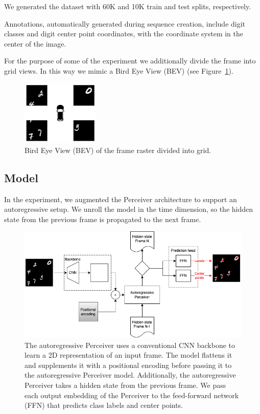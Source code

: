 We generated the dataset with 60K and 10K train and test splits, respectively.

Annotations, automatically generated during sequence creation, include digit classes and digit center point coordinates, with the coordinate system in the center of the image.

For the purpose of some of the experiment we additionally divide the frame into grid views. In this way we mimic a Bird Eye View (BEV) (see Figure~\ref{fig:figure_methods_dataset_image_view_bev}).

\begin{figure}
    \centering
    \includegraphics[width=0.33\textwidth]{figures/figure_methods_dataset_image_view_bev.png}
    \caption{Bird Eye View (BEV) of the frame raster divided into grid.}
    \label{fig:figure_methods_dataset_image_view_bev}
\end{figure}


\subsection{Model}

In the experiment, we augmented the Perceiver architecture \cite{jaeglePerceiverGeneralPerception2021} to support an autoregressive setup. We unroll the model in the time dimension, so the hidden state from the previous frame is propagated to the next frame.

\begin{figure}
    \centering
    \includegraphics[width=\textwidth]{figures/figure_methods_model_ar_perceiver.png}
    \caption{The autoregressive Perceiver uses a conventional CNN backbone to learn a 2D representation of an input frame. The model flattens it and supplements it with a positional encoding before passing it to the autoregressive Perceiver model. Additionally, the autoregressive Perceiver takes a hidden state from the previous frame. We pass each output embedding of the Perceiver to the feed-forward network (FFN) that predicts class labels and center points.}
    \label{fig:figure_methods_model_ar_perceiver}
\end{figure}

